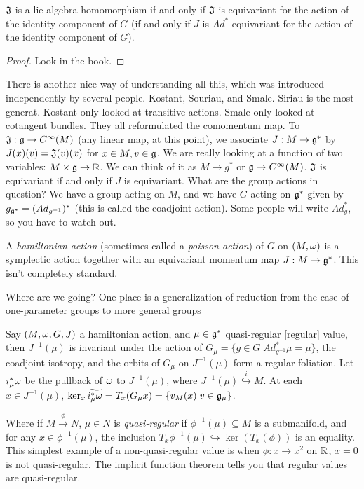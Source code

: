  \begin{proposition}
   $\mathfrak{J}$ is a lie algebra homomorphism if and only if $\mathfrak{J}$ is
   equivariant for the action of the identity component of $G$ (if
   and only if $J$ is $Ad^*$-equivariant for the action of the
   identity component of $G$).
 \end{proposition}
 \begin{proof}
   Look in the book.
 \end{proof}

 There is another nice way of understanding all this, which was
 introduced independently by several people.  Kostant, Souriau,
 and Smale.  Siriau is the most generat.  Kostant only looked at
 transitive actions. Smale only looked at cotangent bundles.  They
 all reformulated the comomentum map.  To $\mathfrak{J}:\mathfrak{g}\to C^\infty(M)$
 (any linear map, at this point), we associate $J:M\to \mathfrak{g}^*$ by
 $J(x)(v)=\mathfrak{J}(v)(x)$ for $x\in M,v\in \mathfrak{g}$.  We are really looking
 at a function of two variables: $M\times\mathfrak{g} \to \mathbb{R}$.  We can
 think of it as $M\to g^*$ or $\mathfrak{g}\to C^\infty(M)$.  $\mathfrak{J}$ is
 equivariant if and only if $J$ is equivariant.  What are the
 group actions in question?  We have a group acting on $M$, and we
 have $G$ acting on $\mathfrak{g}^*$ given by $g_{\mathfrak{g}^*}=(Ad_{g^{-1}})^*$
 (this is called the coadjoint action).  Some people will write
 $Ad^*_g$, so you have to watch out.

 A \emph{hamiltonian action} (sometimes called a \emph{poisson
 action}) of $G$ on $(M,\omega)$ is a symplectic action together with
 an equivariant momentum map $J:M\to \mathfrak{g}^*$.  This isn't completely
 standard.

 Where are we going?  One place is a generalization of reduction
 from the case of one-parameter groups to more general groups

 \begin{theorem}
   Say $(M,\omega,G,J)$ a hamiltonian action, and $\mu \in \mathfrak{g}^*$
   quasi-regular [regular] value, then $J^{-1}(\mu)$ is invariant
   under the action of $G_\mu=\{g\in G|Ad^*_{g^{-1}}\mu=\mu \}$,
   the coadjoint isotropy, and the orbits of $G_\mu$ on
   $J^{-1}(\mu)$ form a regular foliation. Let $i_\mu^*\omega$ be the
   pullback of $\omega$ to $J^{-1}(\mu)$, where
   $J^{-1}(\mu)\stackrel{i}{\hookrightarrow} M$. At each $x\in
   J^{-1}(\mu)$, $\ker_x\widetilde{i_\mu^*\omega} = T_x(G_\mu x) = \{
   v_M(x)|v\in \mathfrak{g}_\mu\}$.
 \end{theorem}
 Where if $M\xrightarrow{\phi}N$, $\mu\in N$ is
 \emph{quasi-regular} if $\phi^{-1}(\mu)\subseteq M$ is a
 submanifold, and for any $x\in \phi^{-1}(\mu)$, the inclusion
 $T_x\phi^{-1}(\mu)\hookrightarrow \ker(T_x(\phi))$ is an
 equality.  This simplest example of a non-quasi-regular value is
 when $\phi:x\to x^2$ on $\mathbb{R}$, $x=0$ is not quasi-regular.  The
 implicit function theorem tells you that regular values are
 quasi-regular.

